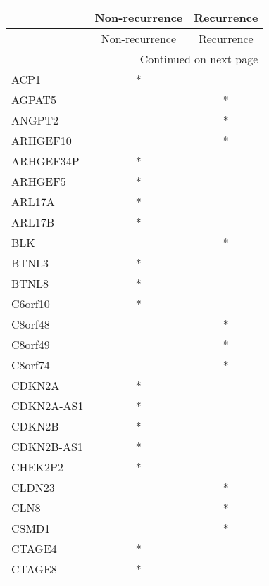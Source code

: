 \begin{longtable}{lcc}
\toprule
{} & Non-recurrence & Recurrence \\
\midrule
\endfirsthead

\toprule
{} & Non-recurrence & Recurrence \\
\midrule
\endhead
\midrule
\multicolumn{3}{r}{{Continued on next page}} \\
\midrule
\endfoot

\bottomrule
\endlastfoot
ACP1         &              * &            \\
AGPAT5       &                &          * \\
ANGPT2       &                &          * \\
ARHGEF10     &                &          * \\
ARHGEF34P    &              * &            \\
ARHGEF5      &              * &            \\
ARL17A       &              * &            \\
ARL17B       &              * &            \\
BLK          &                &          * \\
BTNL3        &              * &            \\
BTNL8        &              * &            \\
C6orf10      &              * &            \\
C8orf48      &                &          * \\
C8orf49      &                &          * \\
C8orf74      &                &          * \\
CDKN2A       &              * &            \\
CDKN2A-AS1   &              * &            \\
CDKN2B       &              * &            \\
CDKN2B-AS1   &              * &            \\
CHEK2P2      &              * &            \\
CLDN23       &                &          * \\
CLN8         &                &          * \\
CSMD1        &                &          * \\
CTAGE4       &              * &            \\
CTAGE8       &              * &            \\

\end{longtable}
